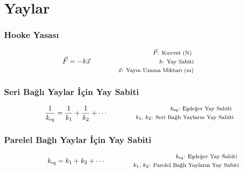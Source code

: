 \section{Yaylar}

\subsubsection*{Hooke Yasası}
\begin{equation}
    \vec{F} = -k\vec{x} \qquad \qquad \parbox{4cm}{\footnotesize$\begin{aligned}
        \vec{F}\text{: Kuvvet (N) } \\
        k\text{: Yay Sabiti} \\
        \vec{x}\text{: Yayın Uzama Miktarı (m)}
\end{aligned}$}
\end{equation}

\subsubsection*{Seri Bağlı Yaylar İçin Yay Sabiti}
\begin{equation}
    \frac{1}{k_{\text{eş}}} = \frac{1}{k_1} + \frac{1}{k_2} + \cdots \qquad \qquad \parbox{4cm}{\footnotesize$
    \begin{aligned}
        k_{\text{eş}}\text{: Eşdeğer Yay Sabiti } \\
        k_1\text{, }k_2\text{: Seri Bağlı Yayların Yay Sabiti}
    \end{aligned}$}
\end{equation}

\subsubsection*{Parelel Bağlı Yaylar İçin Yay Sabiti}
\begin{equation}
   k_{\text{eş}} = k_1 + k_2 + \cdots \qquad \qquad \parbox{4cm}{\footnotesize$
    \begin{aligned}
        k_{\text{eş}}\text{: Eşdeğer Yay Sabiti } \\
        k_1\text{, }k_2\text{: Parelel Bağlı Yayların Yay Sabiti}
    \end{aligned}$}
\end{equation}